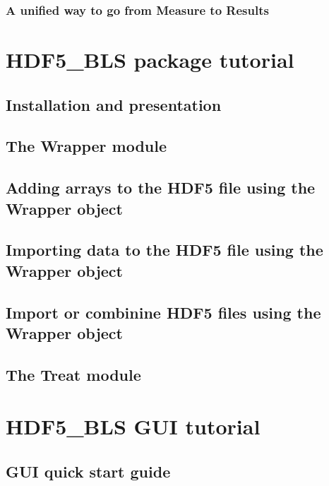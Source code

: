 \documentclass{book}
\newcommand{\mypart}[1]{\setcounter{chapter}{0} \part{#1}}
\begin{document}
    \section*{A unified way to go from Measure to Results}
        


\mypart{HDF5\_BLS package tutorial}\label{chapter:tutorial}
    \chapter*{Installation and presentation}
        
        
    \chapter{The Wrapper module}
        

    \chapter{Adding arrays to the HDF5 file using the Wrapper object}
        

    \chapter{Importing data to the HDF5 file using the Wrapper object}
        

    \chapter{Import or combinine HDF5 files using the Wrapper object}
        

    \chapter{The Treat module}
        

\mypart{HDF5\_BLS GUI tutorial}
    \chapter{GUI quick start guide}
        
\end{document}
